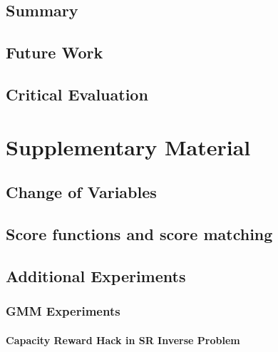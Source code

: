 \documentclass[12pt,a4paper]{report}
\begin{document}
\section{Summary}
\section{Future Work}
\section{Critical Evaluation}

\chapter{Supplementary Material}                    
\section{Change of Variables}
\section{Score functions and score matching}
\section{Additional Experiments}
\subsection{GMM Experiments}
\subsubsection{Capacity Reward Hack in SR Inverse Problem}






\end{document}
